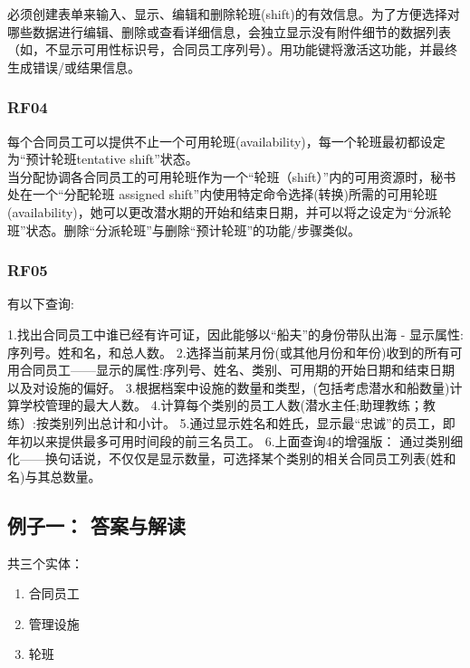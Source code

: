 必须创建表单来输入、显示、编辑和删除轮班(shift)的有效信息。为了方便选择对哪些数据进行编辑、删除或查看详细信息，会独立显示没有附件细节的数据列表（如，不显示可用性标识号，合同员工序列号）。用功能键将激活这功能，并最终生成错误/或结果信息。 \\

\hypertarget{ux63a5ux4e58ux5ba2}{%
\subsubsection{RF04}\label{ux63a5ux4e58ux5ba2}}

每个合同员工可以提供不止一个可用轮班(availability)，每一个轮班最初都设定为“预计轮班tentative shift”状态。\\
当分配协调各合同员工的可用轮班作为一个“轮班（shift）”内的可用资源时，秘书处在一个“分配轮班 assigned shift”内使用特定命令选择(转换)所需的可用轮班(availability)，她可以更改潜水期的开始和结束日期，并可以将之设定为“分派轮班”状态。删除“分派轮班”与删除“预计轮班”的功能/步骤类似。 \\


\hypertarget{ux63a5ux4e58ux5ba2}{%
\subsubsection{RF05}\label{ux63a5ux4e58ux5ba2}}

有以下查询:

1.找出合同员工中谁已经有许可证，因此能够以“船夫”的身份带队出海 - 显示属性:序列号。姓和名，和总人数。
2.选择当前某月份(或其他月份和年份)收到的所有可用合同员工——显示的属性:序列号、姓名、类别、可用期的开始日期和结束日期以及对设施的偏好。
3.根据档案中设施的数量和类型，(包括考虑潜水和船数量)计算学校管理的最大人数。
4.计算每个类别的员工人数(潜水主任;助理教练；教练）:按类别列出总计和小计。
5.通过显示姓名和姓氏，显示最“忠诚”的员工，即年初以来提供最多可用时间段的前三名员工。
6.上面查询4的增强版： 通过类别细化——换句话说，不仅仅是显示数量，可选择某个类别的相关合同员工列表(姓和名)与其总数量。


\hypertarget{ux4f8bux5b50ux4e00-ux7b54ux6848ux4e0eux89e3ux8bfb}{%
\subsection{例子一：
答案与解读}\label{ux4f8bux5b50ux4e00-ux7b54ux6848ux4e0eux89e3ux8bfb}}

共三个实体：

\begin{enumerate}
\tightlist
\item
  合同员工
\item
  管理设施
\item
  轮班
\end{enumerate}

